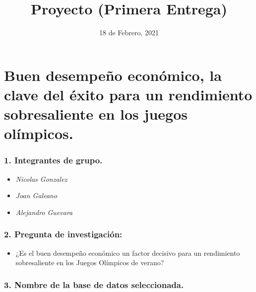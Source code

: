 \documentclass[
]{article}
\title{Proyecto (Primera Entrega)}
\author{}
\date{\vspace{-2.5em}18 de Febrero, 2021}
\providecommand{\tightlist}{%
  \setlength{\itemsep}{0pt}\setlength{\parskip}{0pt}}
\begin{document}
\maketitle

\hypertarget{buen-desempeuxf1o-econuxf3mico-la-clave-del-uxe9xito-para-un-rendimiento-sobresaliente-en-los-juegos-oluxedmpicos.}{%
\section{\texorpdfstring{\textbf{Buen desempeño económico, la clave del
éxito para un rendimiento sobresaliente en los juegos
olímpicos.}}{Buen desempeño económico, la clave del éxito para un rendimiento sobresaliente en los juegos olímpicos.}}\label{buen-desempeuxf1o-econuxf3mico-la-clave-del-uxe9xito-para-un-rendimiento-sobresaliente-en-los-juegos-oluxedmpicos.}}

\hypertarget{integrantes-de-grupo.}{%
\subsubsection{\texorpdfstring{\textbf{1.} Integrantes de
grupo.}{1. Integrantes de grupo.}}\label{integrantes-de-grupo.}}

\begin{itemize}
\item
  \emph{Nicolas Gonzalez}
\item
  \emph{Joan Galeano}
\item
  \emph{Alejandro Guevara}
\end{itemize}

\hypertarget{pregunta-de-investigaciuxf3n}{%
\subsubsection{\texorpdfstring{\textbf{2.} Pregunta de
investigación:}{2. Pregunta de investigación:}}\label{pregunta-de-investigaciuxf3n}}

\begin{itemize}
\tightlist
\item
  ¿Es el buen desempeño económico un factor decisivo para un rendimiento
  sobresaliente en los Juegos Olímpicos de verano?
\end{itemize}

\hypertarget{nombre-de-la-base-de-datos-seleccionada.}{%
\subsubsection{\texorpdfstring{\textbf{3.} Nombre de la base de datos
seleccionada.}{3. Nombre de la base de datos seleccionada.}}\label{nombre-de-la-base-de-datos-seleccionada.}}
\end{document}
